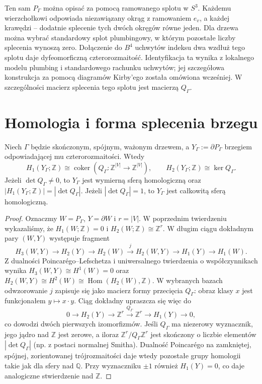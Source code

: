 \begin{uwaga}
Ten sam $P_\Gamma$ można opisać za pomocą ramowanego splotu
w $S^3$. Każdemu wierzchołkowi odpowiada niezawiązany okrąg
z ramowaniem $e_v$, a każdej krawędzi -- dodatnie splecenie
tych dwóch okręgów równe jeden. Dla drzewa można wybrać
standardowy splot plumbingowy, w którym pozostałe liczby
splecenia wynoszą zero. Dołączenie do $B^4$ uchwytów indeksu
dwa wzdłuż tego splotu daje dyfeomorficzną czterorozmaitość.
Identyfikacja ta wynika z lokalnego modelu plumbing i
standardowego rachunku uchwytów; jej szczegółowa konstrukcja
za pomocą diagramów Kirby'ego została omówiona wcześniej.
W szczególności macierz splecenia tego splotu jest macierzą
$Q_\Gamma$.
\end{uwaga}

\section{Homologia i forma splecenia brzegu}
\label{sec:tg-plumbing-boundary}

\begin{twierdzenie}
\label{thm:tg-plumbing-boundary}
Niech $\Gamma$ będzie skończonym, spójnym, ważonym drzewem,
a $Y_\Gamma:=\partial P_\Gamma$ brzegiem odpowiadającej
mu czterorozmaitości. Wtedy
\[
H_1(Y_\Gamma;\mathbb Z)\cong
\operatorname{coker}(Q_\Gamma:\mathbb Z^{|V|}\to\mathbb Z^{|V|}),
\qquad
H_2(Y_\Gamma;\mathbb Z)\cong\ker Q_\Gamma.
\]
Jeżeli $\det Q_\Gamma\ne0$, to $Y_\Gamma$ jest wymierną
sferą homologiczną oraz
$|H_1(Y_\Gamma;\mathbb Z)|=|\det Q_\Gamma|$.
Jeżeli $|\det Q_\Gamma|=1$, to $Y_\Gamma$ jest całkowitą
sferą homologiczną.
\end{twierdzenie}

\begin{proof}
Oznaczmy $W=P_\Gamma$, $Y=\partial W$ i $r=|V|$.
W poprzednim twierdzeniu wykazaliśmy, że $H_1(W;\mathbb Z)=0$
i $H_2(W;\mathbb Z)\cong\mathbb Z^r$.
W długim ciągu dokładnym pary $(W,Y)$ występuje fragment
\[
H_3(W,Y)\longrightarrow H_2(Y)\longrightarrow H_2(W)
\xrightarrow{\ j\ }H_2(W,Y)\longrightarrow H_1(Y)
\longrightarrow H_1(W).
\]
Z dualności Poincarégo--Lefschetza i uniwersalnego twierdzenia
o współczynnikach wynika
$H_3(W,Y)\cong H^1(W)=0$ oraz
$H_2(W,Y)\cong H^2(W)\cong\operatorname{Hom}(H_2(W),\mathbb Z)$.
W wybranych bazach odwzorowanie $j$ zapisuje się jako macierz
formy przecięcia $Q_\Gamma$: obraz klasy $x$ jest funkcjonałem
$y\mapsto x\cdot y$. Ciąg dokładny upraszcza się więc do
\[
0\longrightarrow H_2(Y)\longrightarrow\mathbb Z^r
\xrightarrow{Q_\Gamma}\mathbb Z^r
\longrightarrow H_1(Y)\longrightarrow0,
\]
co dowodzi dwóch pierwszych izomorfizmów. Jeśli $Q_\Gamma$
ma niezerowy wyznacznik, jego jądro nad $\mathbb Z$ jest zerowe,
a iloraz $\mathbb Z^r/Q_\Gamma\mathbb Z^r$ jest skończony
o liczbie elementów $|\det Q_\Gamma|$ (np. z postaci normalnej
Smitha). Dualność Poincarégo na zamkniętej, spójnej,
zorientowanej trójrozmaitości daje wtedy pozostałe grupy
homologii takie jak dla sfery nad $\mathbb Q$.
Przy wyznaczniku $\pm1$ również $H_1(Y)=0$, co daje
analogiczne stwierdzenie nad $\mathbb Z$.
\end{proof}

